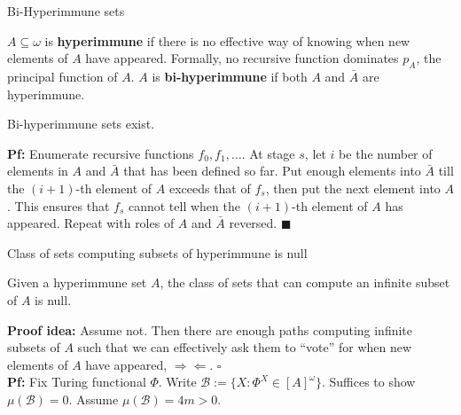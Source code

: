 \begin{frame}{Bi-Hyperimmune sets}
  \begin{define}
    $A\subseteq\omega$ is \textbf{hyperimmune} if there is no effective way
    of knowing when new elements of $A$ have appeared.  Formally, no
    recursive function dominates $p_A$, the principal function of $A$. $A$
    is \textbf{bi-hyperimmune} if both $A$ and $\bar{A}$ are hyperimmune.
  \end{define}

  \begin{thm}
    Bi-hyperimmune sets exist.
  \end{thm}

  \textbf{Pf:} Enumerate recursive functions $f_0,f_1,\ldots$. At stage
  $s$, let $i$ be the number of elements in $A$ and $\bar{A}$ that has been
  defined so far. Put enough elements into $\bar{A}$ till the $(i+1)$-th
  element of $A$ exceeds that of $f_s$, then put the next element into $A$.
  This ensures that $f_s$ cannot tell when the $(i+1)$-th element of $A$
  has appeared. Repeat with roles of $A$ and $\bar{A}$ reversed.
  $\blacksquare$
\end{frame}

\begin{frame}{Class of sets computing subsets of hyperimmune is null}
  \begin{thm}
    \label{thm:bihyper-null}
    Given a hyperimmune set $A$, the class of sets that can compute an
    infinite subset of $A$ is null.
  \end{thm}

  \vspace{1em}
  \textbf{Proof idea:} Assume not. Then there are enough paths computing
  infinite subsets of $A$ such that we can effectively ask them to ``vote''
  for when new elements of $A$ have appeared,
  $\Rightarrow\Leftarrow$. $\square$\\

  \vspace{1em}
  \textbf{Pf:} Fix Turing functional $\Phi$. Write $\mathcal{B} :=\{X:
  \Phi^X\in[A]^\omega\}$. Suffices to show $\mu(\mathcal{B})=0$. Assume
  $\mu(\mathcal{B})=4m>0$.
\end{frame}


